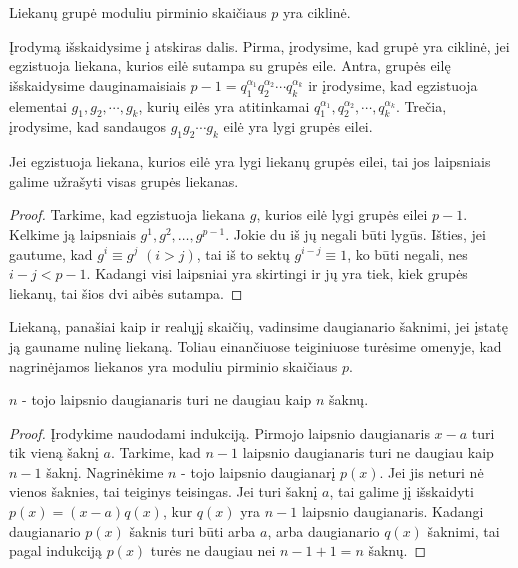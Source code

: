 \begin{thm} 
  Liekanų grupė moduliu pirminio skaičiaus $p$ yra ciklinė.
\end{thm}

Įrodymą išskaidysime į atskiras dalis. Pirma, įrodysime, kad grupė yra
ciklinė, jei egzistuoja liekana, kurios eilė sutampa su grupės eile. Antra,
grupės eilę išskaidysime dauginamaisiais $p-1 = q_1^{\alpha_1}
q_2^{\alpha_2} \cdots q_k^{\alpha_k}$ ir įrodysime, kad egzistuoja
elementai $g_1, g_2, \cdots, g_k$, kurių eilės yra atitinkamai
$q_1^{\alpha_1}, q_2^{\alpha_2}, \cdots, q_k^{\alpha_k}$. Trečia,
įrodysime, kad sandaugos $g_1g_2\cdots g_k$ eilė yra lygi grupės eilei. 

\begin{teig}
  Jei egzistuoja liekana, kurios eilė yra lygi liekanų grupės eilei, tai jos
  laipsniais galime užrašyti visas grupės liekanas.
\end{teig}

\begin{proof}
  Tarkime, kad egzistuoja liekana $g$, kurios eilė lygi grupės eilei
  $p-1$. Kelkime ją laipsniais $g^1, g^2, \dots, g^{p-1}$. Jokie du iš jų
  negali būti lygūs. Išties, jei gautume, kad $g^i \equiv g^j$ $(i>j)$, tai iš to
  sektų $g^{i-j}\equiv 1$, ko būti negali, nes $i-j<p-1$. Kadangi visi
  laipsniai yra skirtingi ir jų yra tiek, kiek grupės liekanų, tai šios dvi
  aibės sutampa.
\end{proof}

Liekaną, panašiai kaip ir realųjį skaičių, vadinsime daugianario šaknimi,
jei įstatę ją gauname nulinę liekaną. Toliau einančiuose teiginiuose
turėsime omenyje, kad nagrinėjamos liekanos yra moduliu pirminio skaičiaus
$p$. 

\begin{teig}
  $n$ - tojo laipsnio daugianaris turi ne daugiau kaip $n$ šaknų.
\end{teig}

\begin{proof}
Įrodykime naudodami indukciją. Pirmojo laipsnio daugianaris $x-a$ turi tik
vieną šaknį $a$. Tarkime, kad $n-1$ laipsnio daugianaris turi ne daugiau
kaip $n-1$ šaknį. Nagrinėkime $n$ - tojo laipsnio daugianarį $p(x)$. Jei
jis neturi nė vienos šaknies, tai teiginys teisingas. Jei turi šaknį $a$,
tai galime jį išskaidyti $p(x) = (x-a)q(x)$, kur $q(x)$ yra $n-1$ laipsnio
daugianaris. Kadangi daugianario $p(x)$ šaknis turi būti arba $a$, arba
daugianario $q(x)$ šaknimi, tai pagal indukciją $p(x)$ turės ne daugiau nei
$n - 1 + 1 = n$ šaknų.  
\end{proof}

